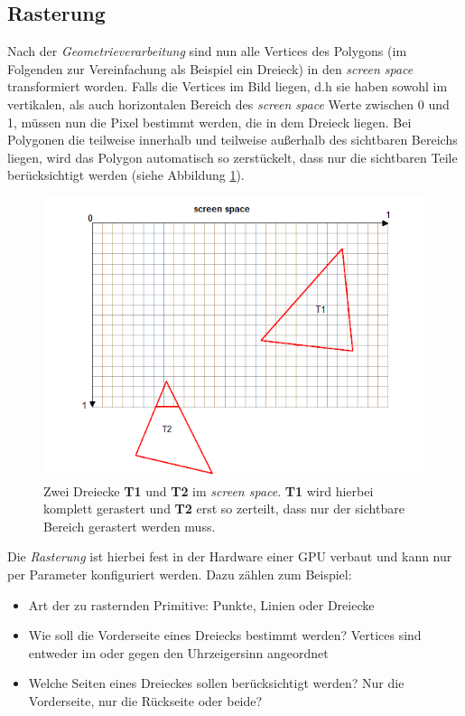 \documentclass[oneside]{ausarbeitung}
\begin{document}
\subsection{Rasterung}
\label{sub:rasterizing}
Nach der \textit{Geometrieverarbeitung} sind nun alle Vertices des Polygons (im Folgenden zur Vereinfachung als Beispiel ein Dreieck) in den \textit{screen space} transformiert worden. Falls die Vertices im Bild liegen, d.h sie haben sowohl im vertikalen, als auch horizontalen Bereich des \textit{screen space} Werte zwischen 0 und 1, müssen nun die Pixel bestimmt werden, die in dem Dreieck liegen. Bei Polygonen die teilweise innerhalb und teilweise außerhalb des sichtbaren Bereichs liegen, wird das Polygon automatisch so zerstückelt, dass nur die sichtbaren Teile berücksichtigt werden (siehe Abbildung \ref{fig:screen_space}).

\begin{figure}
    \includegraphics[width=\textwidth]{images/screen_space_rasterizing.png}
    \caption{Zwei Dreiecke \textbf{T1} und \textbf{T2} im \textit{screen space}. \textbf{T1} wird hierbei komplett gerastert und \textbf{T2} erst so zerteilt, dass nur der sichtbare Bereich gerastert werden muss.}
    \label{fig:screen_space}
\end{figure}

Die \textit{Rasterung} ist hierbei fest in der Hardware einer \ac{GPU} verbaut und kann nur per Parameter konfiguriert werden. Dazu zählen zum Beispiel:

\begin{itemize}
\item{Art der zu rasternden Primitive: Punkte, Linien oder Dreiecke}
\item{Wie soll die Vorderseite eines Dreiecks bestimmt werden? Vertices sind entweder im oder gegen den Uhrzeigersinn angeordnet}
\item{Welche Seiten eines Dreieckes sollen berücksichtigt werden? Nur die Vorderseite, nur die Rückseite oder beide?}
\end{itemize}
\end{document}
